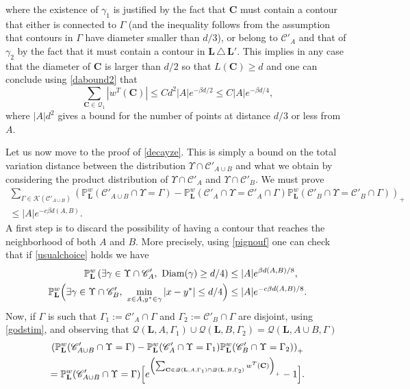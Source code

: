\documentclass[10pt]{amsart}
\let\mathcal\mathscr
\numberwithin{equation}{section}
\theoremstyle{plain}
\theoremstyle{definition}
\newcommand{\Diam}{\mathrm{Diam}}
\newcommand{\cQ}{{\ensuremath{\mathcal Q}} }
\newcommand{\cC}{{\ensuremath{\mathcal C}} }
\newcommand{\cK}{{\ensuremath{\mathcal K}} }
\newcommand{\bC}{{\ensuremath{\mathbf C}} }
\newcommand{\bL}{{\ensuremath{\mathbf L}} }
\newcommand{\bbP}{{\ensuremath{\mathbb P}} }
\newcommand{\gb}{\beta}
\newcommand{\gG}{\Gamma}
\begin{document}
where the existence of $\gamma_1$ is justified by the fact that $\bC$ must contain a contour that either is connected to $\gG$ (and the inequality follows from
the assumption that contours in $\gG$ have diameter smaller than $d/3$), or belong to $\cC'_A$
and that of $\gamma_2$ by the fact that
it must contain a contour in $\bL\,\triangle\,\bL'$.
This implies in any case that the diameter of $\bC$ is larger than $d/2$ so that $L(\bC)\ge d$ and one can conclude using \eqref{dabound2} that
\begin{equation*}
\sum_{\bC\in \cQ_1} |w^T(\bC)|\le C d^2 |A|e^{-\gb d/2}\le C|A|e^{-\gb d/4},
\end{equation*}
where $|A|d^2$ gives a bound for the number of points at distance $d/3$ or less from $A$.

Let us now move to the proof of \eqref{decayze}.
This is simply a bound on the total variation distance between the distribution $\Upsilon \cap \cC'_{A\cup B}$ and what we obtain by considering the product distribution of $\Upsilon \cap \cC'_A$ and $\Upsilon \cap \cC'_B$. We must prove
\begin{multline*}
\sum_{\gG \in \cK(\cC'_{A\cup B})}\left(\bbP^w_{\bL}(\cC'_{A\cup B} \cap \Upsilon= \gG)- \bbP^w_{\bL}(\cC'_A\cap \Upsilon= \cC'_A\cap \gG)
\bbP^w_{\bL}(\cC'_B\cap \Upsilon=\cC'_B\cap \gG) \right)_+\\[-5pt]
\le |A| e^{-c\gb d(A,B)}.
\end{multline*}
A first step is to discard the possibility of having a contour that reaches the neighborhood of both $A$ and $B$. More precisely, using \eqref{pignouf}
one can check that if \eqref{usualchoice}
holds we have
\begin{equation}\label{badseeds}\begin{split}
\bbP^w_{\bL}\left(\exists \gamma \in \Upsilon \cap \cC'_{A}, \ \Diam(\gamma)\ge d/4 \right)&\le |A| e^{\gb d(A,B)/8},\\
\bbP^w_{\bL}\Bigl(\exists \gamma \in \Upsilon \cap \cC'_{B}, \ \min_{x\in A, y^*\in \gamma}|x-y^*|\le d/4 \Bigr) &\le |A| e^{-c\gb d(A,B)/8}.
\end{split}
\end{equation}
Now, if $\gG$ is such that $ \gG_1:= \cC'_A\cap \gG$ and $\gG_2:=\cC'_B\cap \gG$ are disjoint,
using \eqref{godstim}, and observing that $\cQ(\bL,A,\gG_1)\cup \cQ(\bL,B,\gG_2)= \cQ(\bL,A\cup B,\gG)$
\begin{multline*}
\left(\bbP^w_{\bL}(\cC'_{A\cup B} \cap \Upsilon= \gG)- \bbP^w_{\bL}(\cC'_A\cap \Upsilon= \gG_1)
\bbP^w_{\bL}(\cC'_B\cap \Upsilon=\gG_2) \right)_+
\\= \bbP^w_{\bL}(\cC'_{A\cup B} \cap \Upsilon= \gG)\Bigl[e^{\left(\sum_{\bC\in \cQ(\bL,A,\gG_1)\cap\cQ(\bL,B,\gG_2) } w^T(\bC)\right)_+}-1\Bigr].
\end{multline*}
\end{document}
